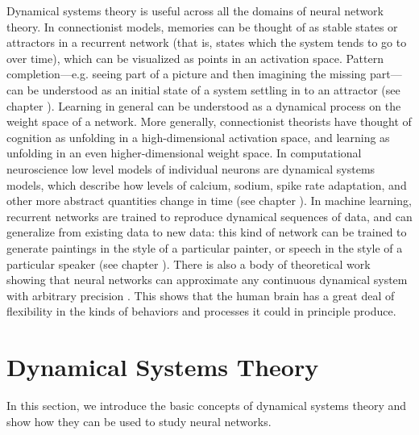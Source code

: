 Dynamical systems theory is useful across all the domains of neural network theory. In connectionist models,  memories can be thought of as stable states or attractors in a recurrent network (that is, states which the system tends to go to over time), which can be visualized as points in an activation space. Pattern completion---e.g. seeing part of a picture and then imagining the missing part---can be understood as an initial state of a system settling in to an attractor (see chapter ). Learning in general can be understood as a dynamical process on the weight space of a network. More generally, connectionist theorists have thought of cognition as unfolding in a high-dimensional activation space, and learning as unfolding in an even higher-dimensional weight space. In computational neuroscience low level models of individual neurons are dynamical systems models, which describe how levels of calcium, sodium, spike rate adaptation, and other more abstract quantities change in time (see chapter ). In machine learning, recurrent networks are trained to reproduce dynamical sequences of data, and can generalize from existing data to new data: this kind of network can be trained to generate paintings in the style of a particular painter, or speech in the style of a particular speaker (see chapter ). There is also a body of theoretical work showing that neural networks can approximate any continuous dynamical system with arbitrary precision \cite{hornik1989multilayer}. This shows that the human brain has a great deal of flexibility in the kinds of behaviors and processes it could in principle produce. 

\section{Dynamical Systems Theory}

In this section, we introduce the basic concepts of dynamical systems theory and show 
how they can be used to study neural networks. 

